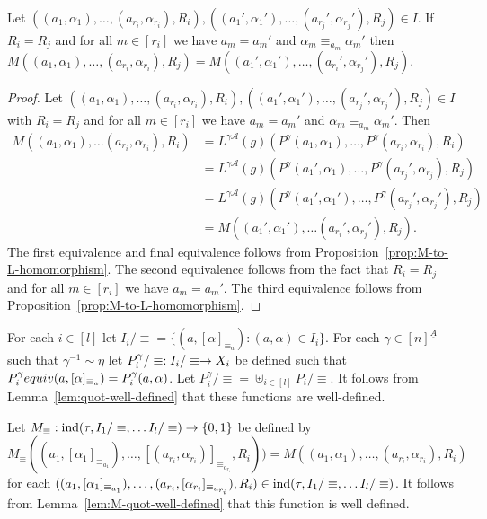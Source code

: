 \documentclass[../main/thesis.tex]{subfiles}
\begin{document}
\begin{lem}
  Let $((a_1, \alpha_1), \ldots, (a_{r_i}, \alpha_{r_i}), R_i), ((a_1',
  \alpha_1'), \ldots, (a_{r_{j}}', \alpha_{r_j}'), R_j) \in I$. If $R_i = R_j$
  and for all $m \in [r_i]$ we have $a_m = a_m'$ and $\alpha_{m} \equiv_{a_m}
  \alpha_m'$ then $M ((a_1, \alpha_1), \ldots, (a_{r_i}, \alpha_{r_i}), R_j) =
  M((a_1', \alpha_1'), \ldots, (a_{r_i}', \alpha_{r_j}'), R_j)$.
  \label{lem:M-quot-well-defined}
\end{lem}
\begin{proof}
  Let $((a_1, \alpha_1), \ldots, (a_{r_i}, \alpha_{r_i}), R_i), ((a_1',
  \alpha_1'), \ldots, (a_{r_{j}}', \alpha_{r_j}'), R_j) \in I$ with $R_i = R_j$
  and for all $m \in [r_i]$ we have $a_m = a_m'$ and $\alpha_{m} \equiv_{a_m}
  \alpha_m'$. Then
  \begin{align*}
    M((a_1, \alpha_1), \ldots (a_{r_i}, \alpha_{r_i}), R_i)  &= L^{\gamma \mathcal{A}}(g)(P^{\gamma}(a_1, \alpha_1), \ldots, P^{\gamma}(a_{r_i}, \alpha_{r_i}), R_i)\\
                                                             &= L^{\gamma \mathcal{A}}(g)(P^{\gamma}(a_1', \alpha_1), \ldots, P^{\gamma}(a_{r_j}', \alpha_{r_j}), R_j) \\
                                                             &= L^{\gamma \mathcal{A}}(g)(P^{\gamma}(a_1', \alpha_1'), \ldots, P^{\gamma}(a_{r_j}', \alpha_{r_j}'), R_j) \\
                                                             &= M((a_1', \alpha_1'), \ldots (a_{r_i}', \alpha_{r_j}'), R_j).
  \end{align*}
  The first equivalence and final equivalence follows from
  Proposition~\ref{prop:M-to-L-homomorphism}. The second equivalence follows
  from the fact that $R_i = R_j$ and for all $m \in [r_i]$ we have $a_m = a_m'$.
  The third equivalence follows from Proposition~\ref{prop:M-to-L-homomorphism}.
\end{proof}

For each $i \in [l]$ let $I_{i}/\equiv = \{(a, [\alpha]_{\equiv_a}) : (a,
\alpha) \in I_i \}$. For each $\gamma \in [n]^{\underline{A}}$ such that
$\gamma^{-1} \sim \eta$ let $P^{\gamma}_i /\equiv : I_{i}/\equiv \rightarrow X_i$ be
defined such that $P^{\gamma}_i\/equiv (a, [\alpha]_{\equiv_a}) = P^{\gamma}_i
(a, \alpha)$. Let $P^{\gamma}_i /\equiv = \uplus_{i \in [l]}P_i /\equiv$. It
follows from Lemma~\ref{lem:quot-well-defined} that these functions are
well-defined.

Let $M_\equiv : \text{\upshape ind} (\tau, I_{1}/\equiv , \ldots I_{l}/\equiv) \rightarrow \{0,1\}$ be
defined by $M_{\equiv} ((a_1, [\alpha_1]_{\equiv_{a_1}}), \ldots, [(a_{r_i},
\alpha_{r_i})]_{\equiv_{a_{r_i}}}, R_i)) = M((a_1, \alpha_1), \ldots, (a_{r_i},
\alpha_{r_i}), R_i)$ for each $((a_1, [\alpha_1]_{\equiv_{a_1}}), \ldots,
(a_{r_i}, [\alpha_{r_i}]_{\equiv_{a_{r_i}}}), R_i) \in \text{\upshape ind} (\tau, I_{1}/\equiv
, \ldots I_{l}/\equiv)$. It follows from Lemma~\ref{lem:M-quot-well-defined}
that this function is well defined.
\end{document}
